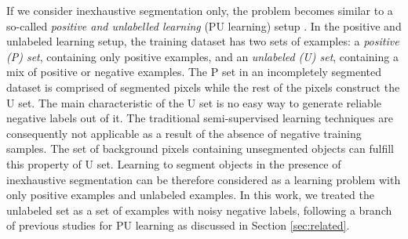 

If we consider inexhaustive segmentation only, the problem becomes similar to a so-called \textit{positive and unlabelled learning} (PU learning) setup \cite{li2005learning}.
In the positive and unlabeled learning setup, the training dataset has two sets of examples: a \textit{positive (P) set}, containing only positive examples, and an \textit{unlabeled (U) set}, containing a mix of positive or negative examples.
The P set in an incompletely segmented dataset is comprised of segmented pixels while the rest of the pixels construct the U set.
The main characteristic of the U set is no easy way to generate reliable negative labels out of it.
The traditional semi-supervised learning techniques are consequently not applicable as a result of the absence of negative training samples.
The set of background pixels containing unsegmented objects can fulfill this property of U set.
Learning to segment objects in the presence of inexhaustive segmentation can be therefore considered as a learning problem with only positive examples and unlabeled examples.
In this work, we treated the unlabeled set as a set of examples with noisy negative labels, following a branch of previous studies for PU learning as discussed in Section \ref{sec:related}.



